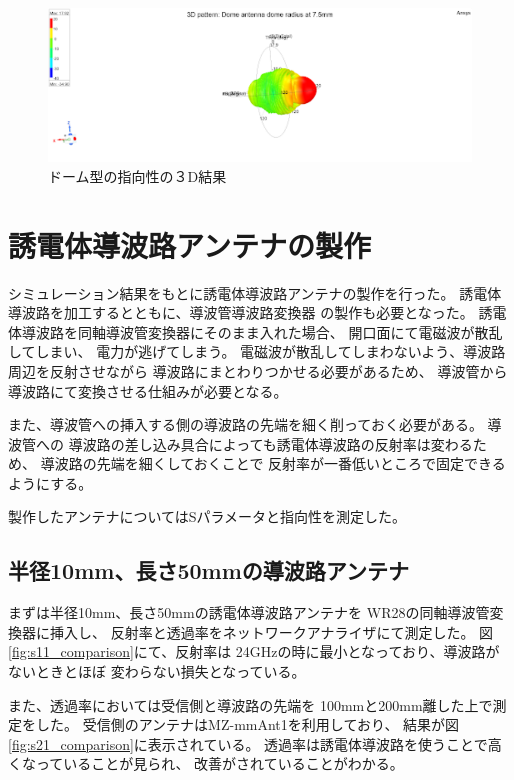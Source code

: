 \documentclass[technicalreport]{ieicej}
\begin{document}
\begin{figure}[tb]
  \begin{center}
    \includegraphics[bb=0 0 324 216, width=1.0\linewidth]{img/dome_directivity.pdf}
    \caption{ドーム型の指向性の３D結果}
    \label{fig:dome_3d_directivity_results}
  \end{center}
\end{figure}


\section{誘電体導波路アンテナの製作}

シミュレーション結果をもとに誘電体導波路アンテナの製作を行った。
誘電体導波路を加工するとともに、導波管導波路変換器
の製作も必要となった。
誘電体導波路を同軸導波管変換器にそのまま入れた場合、
開口面にて電磁波が散乱してしまい、
電力が逃げてしまう。
電磁波が散乱してしまわないよう、導波路周辺を反射させながら
導波路にまとわりつかせる必要があるため、
導波管から導波路にて変換させる仕組みが必要となる。

また、導波管への挿入する側の導波路の先端を細く削っておく必要がある。
導波管への
導波路の差し込み具合によっても誘電体導波路の反射率は変わるため、
導波路の先端を細くしておくことで
反射率が一番低いところで固定できるようにする。

製作したアンテナについてはSパラメータと指向性を測定した。

\subsection{半径10mm、長さ50mmの導波路アンテナ}

まずは半径10mm、長さ50mmの誘電体導波路アンテナを
WR28の同軸導波管変換器に挿入し、
反射率と透過率をネットワークアナライザにて測定した。
図\ref{fig:s11_comparison}にて、反射率は
24GHzの時に最小となっており、導波路がないときとほぼ
変わらない損失となっている。

また、透過率においては受信側と導波路の先端を
100mmと200mm離した上で測定をした。
受信側のアンテナはMZ-mmAnt1を利用しており、
結果が図\ref{fig:s21_comparison}に表示されている。
透過率は誘電体導波路を使うことで高くなっていることが見られ、
改善がされていることがわかる。
\end{document}
